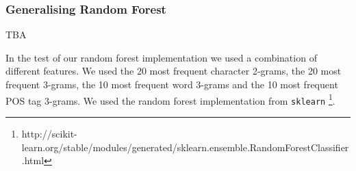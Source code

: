 
\subsubsection{Generalising Random Forest}
TBA


In the test of our random forest implementation we used a combination
of different features. We used the 20 most frequent character
2-grams, the 20 most frequent 3-grams, the 10 most frequent
word 3-grams and the 10 most frequent \gls{POS} tag 3-grams.
We used the random forest implementation from \texttt{sklearn}
\footnote{http://scikit-learn.org/stable/modules/generated/sklearn.ensemble.RandomForestClassifier.html}.


